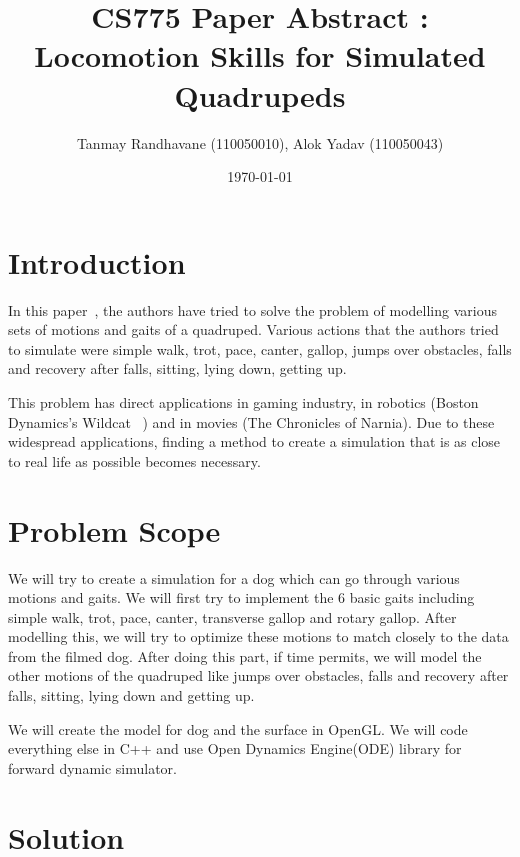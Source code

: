 \documentclass[a4paper,11pt,twocolumn]{article}
\title{CS775 Paper Abstract : Locomotion Skills for Simulated Quadrupeds}
\author{Tanmay Randhavane (110050010), Alok Yadav (110050043)}
\date{\today}
\begin{document}
\maketitle

\section{Introduction}


In this paper~\cite{2011-TOG-quadruped}, the authors have tried to solve the problem of modelling various sets of motions and gaits of a quadruped. Various actions that the authors tried to simulate were simple walk, trot, pace, canter, gallop, jumps over obstacles, falls and recovery after falls, sitting, lying down, getting up.

This problem has direct applications in gaming industry, in robotics (Boston Dynamics's Wildcat ~\cite{Wildcat}) and in movies (The Chronicles of Narnia). Due to these widespread applications, finding a method to create a simulation that is as close to real life as possible becomes necessary.

\section{Problem Scope}
We will try to create a simulation for a dog which can go through various motions and gaits. We will first try to implement the 6 basic gaits including simple walk, trot, pace, canter, transverse gallop and rotary gallop. After modelling this, we will try to optimize these motions to match closely to the data from the filmed dog. After doing this part, if time permits, we will model the other motions of the quadruped like jumps over obstacles, falls and recovery after falls, sitting, lying down and getting up.

We will create the model for dog and the surface in OpenGL. We will code everything else in C++ and use Open Dynamics Engine(ODE) library for forward dynamic simulator.
\section{Solution}

\end{document}
